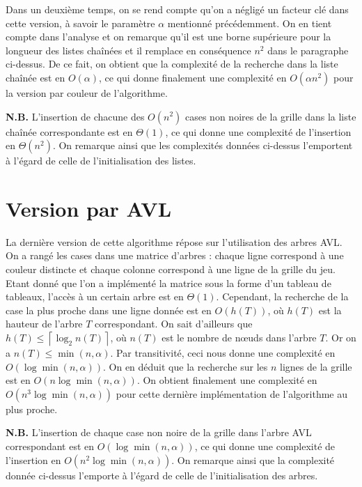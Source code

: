 \documentclass[12pt,a4paper]{article}
\begin{document}
Dans un deuxi\`eme temps, on se rend compte qu'on a n\'eglig\'e un 
facteur cl\'e dans cette version, \`a savoir le param\`etre $\alpha$ 
mentionn\'e pr\'ec\'edemment. On en tient compte dans l'analyse et on remarque 
qu'il est une borne sup\'erieure pour la longueur des listes 
cha\^in\'ees et il remplace en cons\'equence $n^2$ dans le paragraphe 
ci-dessus. De ce fait, on obtient que la complexit\'e de la recherche dans la 
liste cha\^in\'ee est en $O(\alpha)$, ce qui donne finalement une complexit\'e 
en $O(\alpha n^2)$ pour la 
version par couleur de l'algorithme.

{\bfseries N.B.} L'insertion de chacune des $O(n^2)$ cases non noires de la 
grille dans la liste cha\^in\'ee correspondante est en $\Theta(1)$, ce qui donne 
une complexit\'e de l'insertion en $\Theta(n^2)$. On remarque ainsi que les 
complexit\'es donn\'ees ci-dessus l'emportent \`a l'\'egard de celle de 
l'initialisation des listes.

\section{Version par AVL}
La derni\`ere version de cette algorithme r\'epose sur l'utilisation des 
arbres AVL. On a rang\'e les cases dans une matrice d'arbres : chaque ligne 
correspond \`a une couleur distincte et chaque colonne correspond \`a une ligne 
de la grille du jeu. Etant donn\'e que l'on a impl\'ement\'e la 
matrice sous la forme d'un tableau de tableaux, 
l'acc\`es \`a un certain arbre est en $\Theta(1)$. Cependant, la recherche de 
la case la plus proche dans une ligne donn\'ee est en $O(h(T))$, o\`u $h(T)$ 
est la hauteur de l'arbre $T$ correspondant. On sait d'ailleurs que $h(T) \leq 
\left \lceil \log_2 n(T) \right \rceil$, o\`u $n(T)$ est le nombre de 
n\oe uds dans l'arbre $T$. Or on a $n(T) \leq \min(n,\alpha)$. 
Par transitivit\'e, ceci nous donne une complexit\'e en $O(\log 
\min(n,\alpha))$. On en d\'eduit 
que la recherche sur les $n$ lignes de la grille est en $O(n\log 
\min(n,\alpha))$. On obtient finalement une complexit\'e en $O(n^3\log 
\min(n,\alpha))$ pour cette derni\`ere impl\'ementation de l'algorithme au plus 
proche.

{\bfseries N.B.} L'insertion de chaque case non noire de la grille dans l'arbre 
AVL correspondant est en $O(\log \min(n,\alpha))$, ce qui donne une complexit\'e 
de l'insertion en $O(n^2\log \min(n,\alpha))$. On remarque ainsi que 
la complexit\'e donn\'ee ci-dessus l'emporte \`a l'\'egard de celle de 
l'initialisation des arbres.
\end{document}
